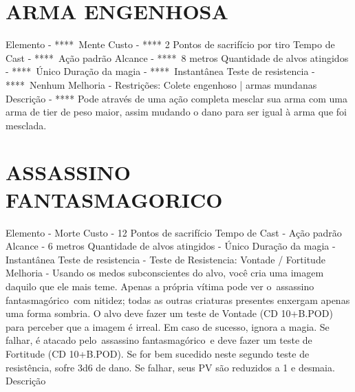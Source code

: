 \documentclass{article}%
\begin{document}
%
\section{ARMA ENGENHOSA}%
\label{sec:ARMAENGENHOSA}%
Elemento {-} ****~Mente\newline%
Custo {-} **** 2 Pontos de sacrifício por tiro\newline%
Tempo de Cast {-} ****~Ação padrão\newline%
Alcance {-} ****~8 metros\newline%
Quantidade de alvos atingidos {-} ****~Único\newline%
Duração da magia {-} ****~Instantânea\newline%
Teste de resistencia {-} ****~Nenhum\newline%
Melhoria {-} Restrições: Colete engenhoso | armas mundanas\newline%
Descrição {-} **** Pode através de uma ação completa mesclar sua arma com uma arma de tier de peso maior, assim mudando o dano para ser igual à arma que foi mesclada.\newline%

%
\section{ASSASSINO FANTASMAGORICO}%
\label{sec:ASSASSINOFANTASMAGORICO}%
Elemento {-}  Morte\newline%
Custo {-}  12 Pontos de sacrifício\newline%
Tempo de Cast {-}  Ação padrão\newline%
Alcance {-}  6 metros\newline%
Quantidade de alvos atingidos {-}  Único\newline%
Duração da magia {-}  Instantânea\newline%
Teste de resistencia {-} Teste de Resistencia: Vontade / Fortitude\newline%
Melhoria {-}  Usando os medos subconscientes do alvo, você cria uma imagem daquilo que ele mais teme. Apenas a própria vítima pode ver o~assassino fantasmagórico~com nitidez; todas as outras criaturas presentes enxergam apenas uma forma sombria. O alvo deve fazer um teste de Vontade (CD 10+B.POD) para perceber que a imagem é irreal. Em caso de sucesso, ignora a magia. Se falhar, é atacado pelo~assassino fantasmagórico~e deve fazer um teste de Fortitude (CD 10+B.POD). Se for bem sucedido neste segundo teste de resistência, sofre 3d6 de dano. Se falhar, seus PV são reduzidos a 1 e desmaia.\newline%
Descrição \newline%
\end{document}

